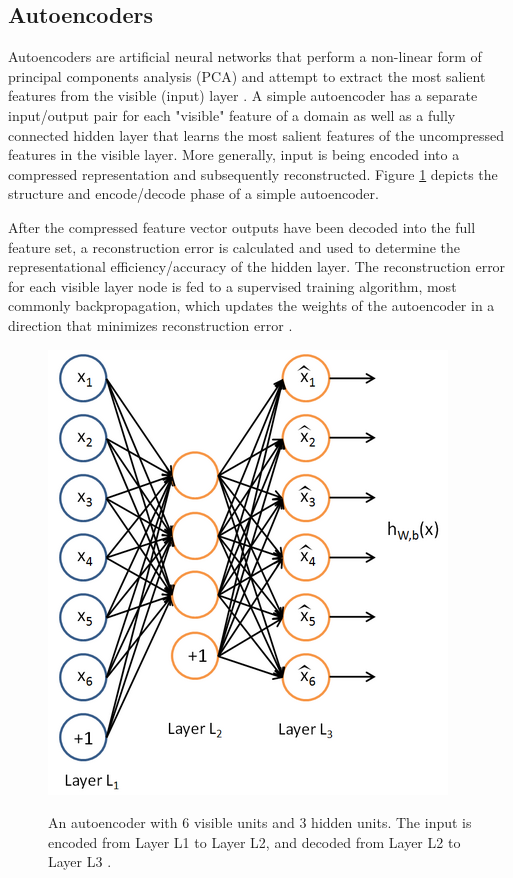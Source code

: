 \documentclass{acm_proc_article-sp}
\begin{document}
\subsection{Autoencoders}
Autoencoders are artificial neural networks that perform a non-linear form of principal components analysis (PCA) and attempt to extract the most salient features from the visible (input) layer \cite{bourland1988, baldi2012autoencoders}.  A simple autoencoder has a separate input/output pair for each "visible" feature of a domain as well as a fully connected hidden layer that learns the most salient features of the uncompressed features in the visible layer.  More generally, input is being encoded into a compressed representation and subsequently reconstructed.  Figure \ref{figure:exampleautoencoder} depicts the structure and encode/decode phase of a simple autoencoder.

After the compressed feature vector outputs have been decoded into the full feature set, a reconstruction error is calculated and used to determine the representational efficiency/accuracy of the hidden layer.  The reconstruction error for each visible layer node is fed to a supervised training algorithm, most commonly backpropagation, which updates the weights of the autoencoder in a direction that minimizes reconstruction error \cite{stanfordimage}.

\begin{figure}[h]
	\caption{An autoencoder with 6 visible units and 3 hidden units.  The input is encoded from Layer L1 to Layer L2, and decoded from Layer L2 to Layer L3 \cite{stanfordimage}.}
	\centering
	\includegraphics[scale=0.8]{ExampleAutoencoder}
	\label{figure:exampleautoencoder}
\end{figure}
\end{document}
